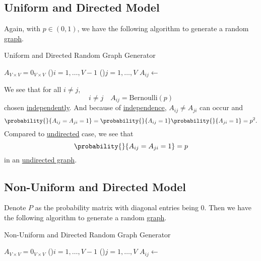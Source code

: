 \subsection{Uniform and Directed Model}\label{subsec:uniform-and-directed-model}
Again, with \(p\in(0, 1)\), we have the following algorithm to generate a random \hyperref[def:graph]{graph}.
\par
\begin{algorithm}[H]\label{algo:uniform-and-directed-model-algo}
	\DontPrintSemicolon
	\caption{Uniform and Directed Random Graph Generator}
	\BlankLine

	\(A_{V\times V} = 0_{V \times V}\) 
	\;
	\For(){\(i= 1, \ldots  , V-1\)}{
		\For(){\(j=1, \ldots  , V\)}{
			\(A_{ij} \gets \)
		}
	}
	\;
\end{algorithm}

We see that for all \(i \neq j\),
\[
	i\neq j\quad A_{ij}= \mathrm{Bernoulli}(p)
\]
chosen \hyperref[def:independent]{independently}. And because of \hyperref[def:independent]{independence},
\(A_{ij}\neq A_{ji}\) can occur and
\[
	\probability{}{A_{ij} = A_{ji} = 1} = \probability{}{A_{ij} = 1} \probability{}{ A_{ji} = 1} = p^2.
\]
Compared to \hyperref[subsec:Uniform-and-Undirected-model]{undirected} case, we see that
\[
	\probability{}{A_{ij} = A_{ji} = 1} = p
\]
in an \hyperref[def:undirected-graph]{undirected graph}.

\subsection{Non-Uniform and Directed Model}\label{subsec:non-uniform-and-directed-model}
Denote \(P\) as the probability matrix with diagonal entries being \(0\). Then we have the following algorithm to
generate a random \hyperref[def:graph]{graph}.

\par
\begin{algorithm}[H]\label{algo:non-uniform-and-directed-model-algo}
	\DontPrintSemicolon
	\caption{Non-Uniform and Directed Random Graph Generator}
	\BlankLine

	\(A_{V\times V} = 0_{V \times V}\) 
	\;
	\For(){\(i= 1, \ldots  , V-1\)}{
	\For(){\(j= 1, \ldots  , V\)}{
	\(A_{ij} \gets \)
	}
	}
	\;
\end{algorithm}

